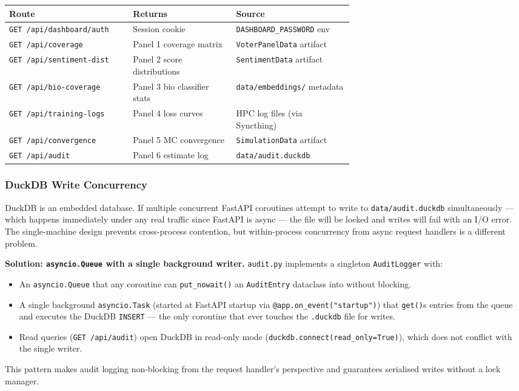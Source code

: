 \documentclass[11pt]{article}
\begin{document}
\begin{center}
\begin{tabularx}{\linewidth}{p{0.36\linewidth}p{0.30\linewidth}X}
\toprule
\textbf{Route} & \textbf{Returns} & \textbf{Source} \\
\midrule
\texttt{GET /api/dashboard/auth} & Session cookie & \texttt{DASHBOARD\_PASSWORD} env \\
\texttt{GET /api/coverage} & Panel 1 coverage matrix & \texttt{VoterPanelData} artifact \\
\texttt{GET /api/sentiment-dist} & Panel 2 score distributions & \texttt{SentimentData} artifact \\
\texttt{GET /api/bio-coverage} & Panel 3 bio classifier stats & \texttt{data/embeddings/} metadata \\
\texttt{GET /api/training-logs} & Panel 4 loss curves & HPC log files (via Syncthing) \\
\texttt{GET /api/convergence} & Panel 5 MC convergence & \texttt{SimulationData} artifact \\
\texttt{GET /api/audit} & Panel 6 estimate log & \texttt{data/audit.duckdb} \\
\bottomrule
\end{tabularx}
\end{center}

\subsubsection*{DuckDB Write Concurrency}

DuckDB is an embedded database. If multiple concurrent FastAPI coroutines attempt
to write to \texttt{data/audit.duckdb} simultaneously --- which happens immediately
under any real traffic since FastAPI is async --- the file will be locked and writes
will fail with an I/O error. The single-machine design prevents cross-process
contention, but within-process concurrency from async request handlers is a
different problem.

\textbf{Solution: \texttt{asyncio.Queue} with a single background writer.}
\texttt{audit.py} implements a singleton \texttt{AuditLogger} with:
\begin{itemize}[leftmargin=1.6em, itemsep=2pt]
  \item An \texttt{asyncio.Queue} that any coroutine can \texttt{put\_nowait()} an
        \texttt{AuditEntry} dataclass into without blocking.
  \item A single background \texttt{asyncio.Task} (started at FastAPI startup via
        \texttt{@app.on\_event("startup")}) that \texttt{get()}s entries from the queue
        and executes the DuckDB \texttt{INSERT} --- the only coroutine that ever touches
        the \texttt{.duckdb} file for writes.
  \item Read queries (\texttt{GET /api/audit}) open DuckDB in read-only mode
        (\texttt{duckdb.connect(read\_only=True)}), which does not conflict with the
        single writer.
\end{itemize}
This pattern makes audit logging non-blocking from the request handler's perspective
and guarantees serialised writes without a lock manager.
\end{document}
